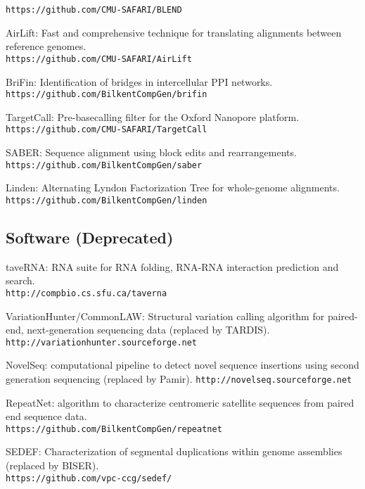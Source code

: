 \begin{list2}
{\tt https://github.com/CMU-SAFARI/BLEND}
  \item
AirLift: Fast and comprehensive technique for translating alignments between reference genomes.\\
{\tt https://github.com/CMU-SAFARI/AirLift}
\item 
BriFin: Identification of bridges in intercellular PPI networks.
{\tt https://github.com/BilkentCompGen/brifin}
\item 
TargetCall: Pre-basecalling filter for the Oxford Nanopore platform.\\
{\tt https://github.com/CMU-SAFARI/TargetCall}
\item 
SABER: Sequence alignment using block edits and rearrangements.\\
{\tt https://github.com/BilkentCompGen/saber}
\item 
Linden: Alternating Lyndon Factorization Tree for whole-genome alignments.\\
{\tt https://github.com/BilkentCompGen/linden}
\end{list2}

\subsection{\small \sc Software (Deprecated)}
\begin{list2}
\item
  taveRNA: RNA suite for RNA folding, RNA-RNA interaction prediction and search. \\
  {\tt http://compbio.cs.sfu.ca/taverna}
\item
  VariationHunter/CommonLAW: Structural variation calling algorithm for paired-end, next-generation sequencing data (replaced by TARDIS).
  {\tt http://variationhunter.sourceforge.net}
\item
  NovelSeq: computational pipeline to detect novel sequence insertions using second generation sequencing (replaced by Pamir).
  {\tt http://novelseq.sourceforge.net}
\item
  RepeatNet: algorithm to characterize centromeric satellite sequences from paired end sequence data.\\
  {\tt https://github.com/BilkentCompGen/repeatnet}
  \item
  SEDEF: Characterization of segmental duplications within genome assemblies (replaced by BISER).\\
  {\tt https://github.com/vpc-ccg/sedef/}
\end{list2}






